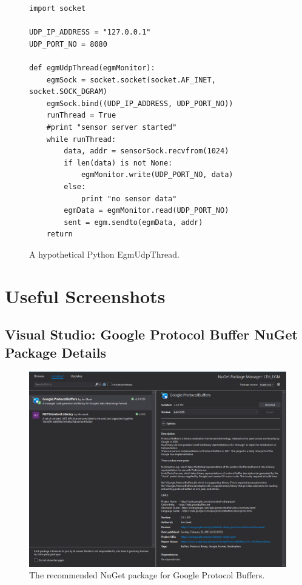 \documentclass{cslthse-msc}
\begin{document}
\begin{appendices}
\lstset{language=Python}
\begin{figure}[H]
\centering
\begin{lstlisting}[fontadjust]
import socket

UDP_IP_ADDRESS = "127.0.0.1"
UDP_PORT_NO = 8080

def egmUdpThread(egmMonitor):
    egmSock = socket.socket(socket.AF_INET, socket.SOCK_DGRAM)
    egmSock.bind((UDP_IP_ADDRESS, UDP_PORT_NO))
    runThread = True
    #print "sensor server started"
    while runThread:
        data, addr = sensorSock.recvfrom(1024)
        if len(data) is not None:
            egmMonitor.write(UDP_PORT_NO, data)
        else:
            print "no sensor data" 
        egmData = egmMonitor.read(UDP_PORT_NO)
        sent = egm.sendto(egmData, addr)
    return
\end{lstlisting}
\caption{A hypothetical Python EgmUdpThread.}
\label{fig:py_thread}
\end{figure}



\chapter{Useful Screenshots}
\label{app:Screenshots}

\section{Visual Studio: Google Protocol Buffer NuGet Package Details}
\label{app:Screenshots:NuGet}
\begin{figure}[H]
    \centering
    \includegraphics[width=12cm]{gpb_dependency.png}
    \caption{The recommended NuGet package for Google Protocol Buffers.}
    \label{fig:gpb_nuget}
\end{figure}


\end{appendices}
\end{document}
